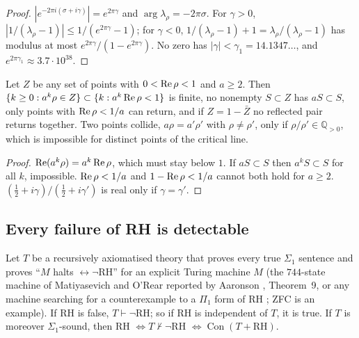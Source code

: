 \begin{proof}
$|e^{-2\pi i(\sigma+i\gamma)}|=e^{2\pi\gamma}$ and $\arg\lambda_\rho=-2\pi\sigma$. For $\gamma>0$, $|1/(\lambda_\rho-1)|\le1/(e^{2\pi\gamma}-1)$; for $\gamma<0$, $1/(\lambda_\rho-1)+1=\lambda_\rho/(\lambda_\rho-1)$ has modulus at most $e^{2\pi\gamma}/(1-e^{2\pi\gamma})$. No zero has $|\gamma|<\gamma_1=14.1347\ldots$, and $e^{2\pi\gamma_1}\approx3.7\cdot10^{38}$.
\end{proof}

\begin{lemma}\label{lem:escape}
Let $Z$ be any set of points with $0<\operatorname{Re}\rho<1$ and $a\ge2$. Then $\{k\ge0:a^k\rho\in Z\}\subset\{k:a^k\operatorname{Re}\rho<1\}$ is finite, no nonempty $S\subset Z$ has $aS\subset S$, only points with $\operatorname{Re}\rho<1/a$ can return, and if $Z=1-\bar Z$ no reflected pair returns together. Two points collide, $a\rho=a'\rho'$ with $\rho\ne\rho'$, only if $\rho/\rho'\in\mathbb{Q}_{>0}$, which is impossible for distinct points of the critical line.
\end{lemma}

\begin{proof}
$\operatorname{Re}(a^k\rho)=a^k\operatorname{Re}\rho$, which must stay below $1$. If $aS\subset S$ then $a^kS\subset S$ for all $k$, impossible. $\operatorname{Re}\rho<1/a$ and $1-\operatorname{Re}\rho<1/a$ cannot both hold for $a\ge2$. $(\tfrac12+i\gamma)/(\tfrac12+i\gamma')$ is real only if $\gamma=\gamma'$.
\end{proof}

\subsection{Every failure of RH is detectable}

\begin{proposition}\label{prop:detect}
Let $T$ be a recursively axiomatised theory that proves every true $\Sigma_1$ sentence and proves ``$M$ halts $\leftrightarrow\neg$RH'' for an explicit Turing machine $M$ (the $744$-state machine of Matiyasevich and O'Rear reported by Aaronson \cite{Aaronson}, Theorem~9, or any machine searching for a counterexample to a $\Pi_1$ form of RH \cite{DMR}; ZFC is an example). If RH is false, $T\vdash\neg$RH; so if RH is independent of $T$, it is true. If $T$ is moreover $\Sigma_1$-sound, then RH $\iff T\nvdash\neg$RH $\iff\operatorname{Con}(T+\text{RH})$.
\end{proposition}

